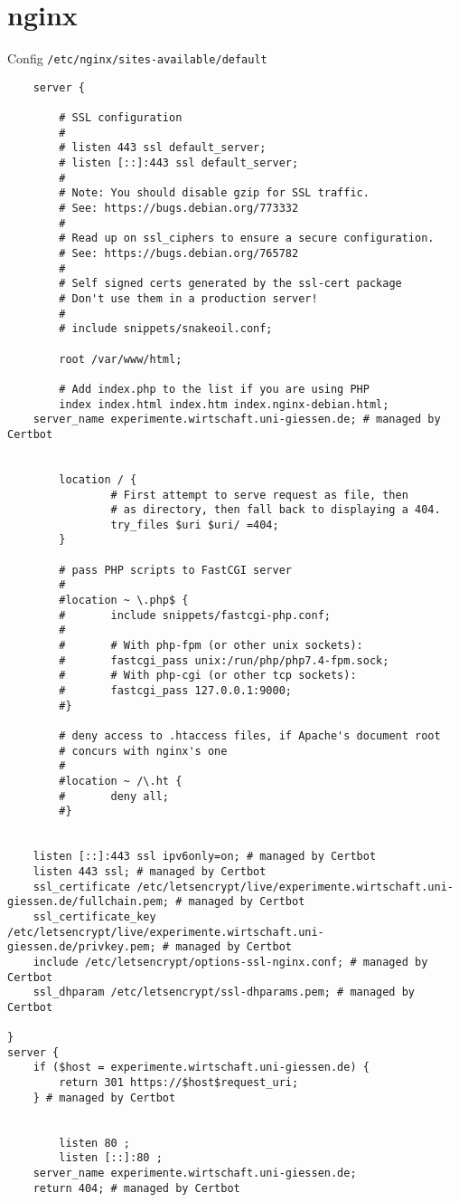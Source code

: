 \documentclass{article}
\begin{document}
\section{nginx}
Config \verb|/etc/nginx/sites-available/default|
\begin{lstlisting}
    server {

        # SSL configuration
        #
        # listen 443 ssl default_server;
        # listen [::]:443 ssl default_server;
        #
        # Note: You should disable gzip for SSL traffic.
        # See: https://bugs.debian.org/773332
        #
        # Read up on ssl_ciphers to ensure a secure configuration.
        # See: https://bugs.debian.org/765782
        #
        # Self signed certs generated by the ssl-cert package
        # Don't use them in a production server!
        #
        # include snippets/snakeoil.conf;

        root /var/www/html;

        # Add index.php to the list if you are using PHP
        index index.html index.htm index.nginx-debian.html;
    server_name experimente.wirtschaft.uni-giessen.de; # managed by Certbot


        location / {
                # First attempt to serve request as file, then
                # as directory, then fall back to displaying a 404.
                try_files $uri $uri/ =404;
        }

        # pass PHP scripts to FastCGI server
        #
        #location ~ \.php$ {
        #       include snippets/fastcgi-php.conf;
        #
        #       # With php-fpm (or other unix sockets):
        #       fastcgi_pass unix:/run/php/php7.4-fpm.sock;
        #       # With php-cgi (or other tcp sockets):
        #       fastcgi_pass 127.0.0.1:9000;
        #}

        # deny access to .htaccess files, if Apache's document root
        # concurs with nginx's one
        #
        #location ~ /\.ht {
        #       deny all;
        #}


    listen [::]:443 ssl ipv6only=on; # managed by Certbot
    listen 443 ssl; # managed by Certbot
    ssl_certificate /etc/letsencrypt/live/experimente.wirtschaft.uni-giessen.de/fullchain.pem; # managed by Certbot
    ssl_certificate_key /etc/letsencrypt/live/experimente.wirtschaft.uni-giessen.de/privkey.pem; # managed by Certbot
    include /etc/letsencrypt/options-ssl-nginx.conf; # managed by Certbot
    ssl_dhparam /etc/letsencrypt/ssl-dhparams.pem; # managed by Certbot

}
server {
    if ($host = experimente.wirtschaft.uni-giessen.de) {
        return 301 https://$host$request_uri;
    } # managed by Certbot


        listen 80 ;
        listen [::]:80 ;
    server_name experimente.wirtschaft.uni-giessen.de;
    return 404; # managed by Certbot
\end{lstlisting}
\end{document}
